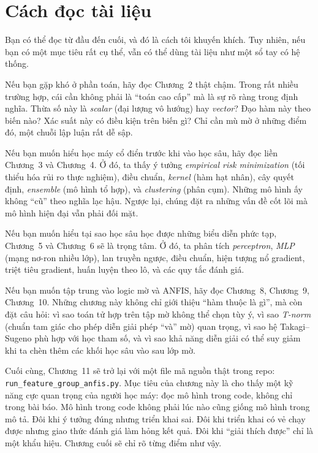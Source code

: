 \section*{Cách đọc tài liệu}

Bạn có thể đọc từ đầu đến cuối, và đó là cách tôi khuyến khích. Tuy nhiên, nếu bạn có một mục tiêu rất cụ thể, vẫn có thể dùng tài liệu như một sổ tay có hệ thống.

Nếu bạn gặp khó ở phần toán, hãy đọc Chương~2 thật chậm. Trong rất nhiều trường hợp, cái cần không phải là ``toán cao cấp'' mà là sự rõ ràng trong định nghĩa. Thừa số này là \emph{scalar} (đại lượng vô hướng) hay \emph{vector}? Đạo hàm này theo biến nào? Xác suất này có điều kiện trên biến gì? Chỉ cần mù mờ ở những điểm đó, một chuỗi lập luận rất dễ sập.

Nếu bạn muốn hiểu học máy cổ điển trước khi vào học sâu, hãy đọc liền Chương~3 và Chương~4. Ở đó, ta thấy ý tưởng \emph{empirical risk minimization} (tối thiểu hóa rủi ro thực nghiệm), điều chuẩn, \emph{kernel} (hàm hạt nhân), cây quyết định, \emph{ensemble} (mô hình tổ hợp), và \emph{clustering} (phân cụm). Những mô hình ấy không ``cũ'' theo nghĩa lạc hậu. Ngược lại, chúng đặt ra những vấn đề cốt lõi mà mô hình hiện đại vẫn phải đối mặt.

Nếu bạn muốn hiểu tại sao học sâu học được những biểu diễn phức tạp, Chương~5 và Chương~6 sẽ là trọng tâm. Ở đó, ta phân tích \emph{perceptron}, \emph{MLP} (mạng nơ-ron nhiều lớp), lan truyền ngược, điều chuẩn, hiện tượng nổ gradient, triệt tiêu gradient, huấn luyện theo lô, và các quy tắc đánh giá.

Nếu bạn muốn tập trung vào logic mờ và ANFIS, hãy đọc Chương~8, Chương~9, Chương~10. Những chương này không chỉ giới thiệu ``hàm thuộc là gì'', mà còn đặt câu hỏi: vì sao toán tử hợp trên tập mờ không thể chọn tùy ý, vì sao \emph{T-norm} (chuẩn tam giác cho phép diễn giải phép ``và'' mờ) quan trọng, vì sao hệ Takagi--Sugeno phù hợp với học tham số, và vì sao khả năng diễn giải có thể suy giảm khi ta chèn thêm các khối học sâu vào sau lớp mờ.

Cuối cùng, Chương~11 sẽ trở lại với một file mã nguồn thật trong repo: \texttt{run\_feature\_group\_anfis.py}. Mục tiêu của chương này là cho thấy một kỹ năng cực quan trọng của người học máy: đọc mô hình trong code, không chỉ trong bài báo. Mô hình trong code không phải lúc nào cũng giống mô hình trong mô tả. Đôi khi ý tưởng đúng nhưng triển khai sai. Đôi khi triển khai có vẻ chạy được nhưng giao thức đánh giá làm hỏng kết quả. Đôi khi ``giải thích được'' chỉ là một khẩu hiệu. Chương cuối sẽ chỉ rõ từng điểm như vậy.

